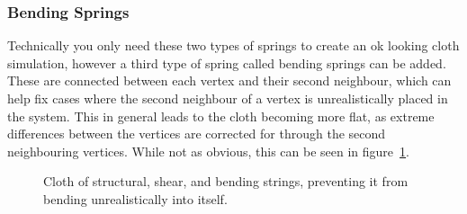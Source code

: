 \subsubsection{Bending Springs}
Technically you only need these two types of springs to create an ok looking cloth simulation,
however a third type of spring called bending springs can be added.
These are connected between each vertex and their second neighbour,
which can help fix cases where the second neighbour of a vertex is unrealistically placed in the system.
This in general leads to the cloth becoming more flat, as extreme differences between the vertices are corrected for
through the second neighbouring vertices\cite{jeff_lander_real_time_cloth}.
While not as obvious, this can be seen in figure~\ref{fig:bending_springs_collapsing}.
\begin{figure}[H]
    \centering
    \caption{Cloth of structural, shear, and bending strings, preventing it from bending unrealistically into itself.}
    \label{fig:bending_springs_collapsing}
\end{figure}


